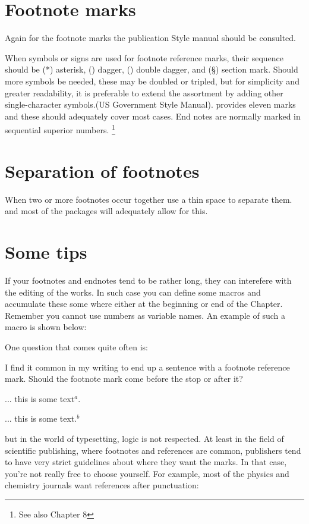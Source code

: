 \section*{Footnote marks}

Again for the footnote marks the publication Style manual should be consulted\pagenote{\noteiii}.

When symbols or signs are used for footnote reference marks, their 
sequence should be (*) asterisk, (\dag) dagger, (\ddag) double dagger, and 
(\S) section mark. Should more symbols be needed, these may be 
doubled or tripled, but for simplicity and greater readability, it is 
preferable to extend the assortment by adding other single-character symbols.(US Government Style Manual). \latex provides eleven marks and these should adequately cover most cases. End notes are normally marked in sequential superior numbers.
\footnote{See also Chapter 8}

\section*{Separation of footnotes}

When two or more footnotes occur together use a thin space to separate them.
\tex and most of the packages will adequately allow for this.


\section{Some tips}

If your footnotes and endnotes tend to be rather long, they can interefere with the editing of the works. In such case you can define some macros and accumulate these some where either at the beginning or end of the Chapter. Remember you cannot use numbers as variable names. An example of such a macro is shown below:

One question that comes quite often is:

I find it common in my writing to end up a sentence with a footnote reference mark. Should the footnote mark come before the stop or after it?

... this is some text$^a$.

... this is some text.$^b$


but in the world of typesetting, logic is not respected. At least in the field of scientific publishing, where footnotes and references are common, publishers tend to have very strict guidelines about where they want the marks. In that case, you're not really free to choose yourself. For example, most of the physics and chemistry journals want references after punctuation:


